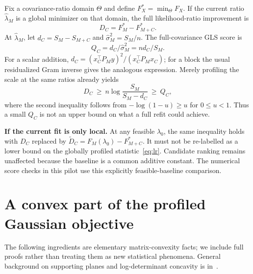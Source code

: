 \documentclass[11pt,a4paper]{article}
\theoremstyle{remark}\newtheorem{remark}[theorem]{Remark}
\begin{document}
Fix a covariance-ratio domain $\Theta$ and define $F_X^*=\min_{\Theta}F_X$. If the
current ratio $\widehat\lambda_M$ is a global minimizer on that domain, the full
likelihood-ratio improvement is
\begin{equation}\label{eq:lr}
D_C=F_M^*-F_{M+C}^*.
\end{equation}
At $\widehat\lambda_M$, let $d_C=S_M-S_{M+C}$ and
$\widehat\sigma_M^2=S_M/n$. The full-covariance GLS score is
\begin{equation}
Q_C=d_C/\widehat\sigma_M^2=nd_C/S_M.
\end{equation}
For a scalar addition, $d_C=(x_C^\top P_My)^2/(x_C^\top P_Mx_C)$; for a block the
usual residualized Gram inverse gives the analogous expression.
Merely profiling the scale at the same ratios already yields
\begin{equation}\label{eq:scale}
D_C\ \geq\ n\log\frac{S_M}{S_M-d_C}\ \geq\ Q_C,
\end{equation}
where the second inequality follows from $-\log(1-u)\geq u$ for $0\leq u<1$.
Thus a small $Q_C$ is not an upper bound on what a full refit could achieve.

\textbf{If the current fit is only local.} At any feasible $\lambda_0$, the same
inequality holds with $D_C$ replaced by
$\widetilde D_C=F_M(\lambda_0)-F_{M+C}^*$. It must not be re-labelled as a lower bound
on the globally profiled statistic~\eqref{eq:lr}. Candidate ranking remains
unaffected because the baseline is a common additive constant. The numerical
score checks in this pilot use this explicitly feasible-baseline comparison.

\section{A convex part of the profiled Gaussian objective}
The following ingredients are elementary matrix-convexity facts; we include full
proofs rather than treating them as new statistical phenomena. General background
on supporting planes and log-determinant concavity is in~\cite{boyd}.
\end{document}
